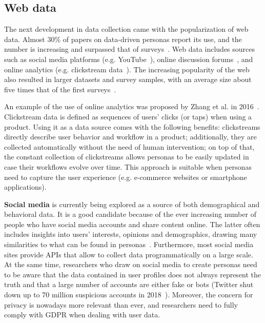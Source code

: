 \subsection{Web data}
\label{subsec:webdata}
The next development in data collection came with the popularization of web data. Almost 30\% of papers on data-driven personas report its use, and the number is increasing and surpassed that of surveys~\cite{salminen2021survey}. Web data includes sources such as social media platforms (e.g. YouTube~\cite{an2018imaginary}), online discussion forums~\cite{huh2016personas}, and online analytics (e.g. clickstream data~\cite{zhang2016data}). The increasing popularity of the web also resulted in larger datasets and survey samples, with an average size about five times that of the first surveys~\cite{salminen2021survey}.

An example of the use of online analytics was proposed by Zhang et al. in 2016~\cite{zhang2016data}. Clickstream data is defined as sequences of users' clicks (or taps) when using a product. Using it as a data source comes with the following benefits: clickstreams directly describe user behavior and workflow in a product; additionally, they are collected automatically without the need of human intervention; on top of that, the constant collection of clickstreams allows personas to be easily updated in case their workflows evolve over time. This approach is suitable when personas need to capture the user experience (e.g. e-commerce websites or smartphone applications).

\textbf{Social media} is currently being explored as a source of both demographical and behavioral data. It is a good candidate because of the ever increasing number of people who have social media accounts and share content online. The latter often includes insights into users' interests, opinions and demographics, drawing many similarities to what can be found in personas~\cite{humphrey2017user}. Furthermore, most social media sites provide APIs that allow to collect data programmatically on a large scale. At the same time, researchers who draw on social media to create personas need to be aware that the data contained in user profiles does not always represent the truth and that a large number of accounts are either fake or bots (Twitter shut down up to 70 million suspicious accounts in 2018~\cite{twitter2018suspicious}). Moreover, the concern for privacy is nowadays more relevant than ever, and researchers need to fully comply with GDPR when dealing with user data.

